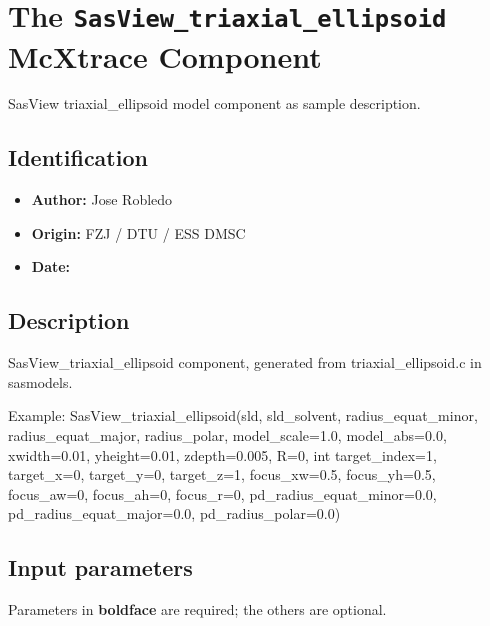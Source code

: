 \section{The \texttt{SasView\_triaxial\_ellipsoid} McXtrace Component}
SasView triaxial\_ellipsoid model component as sample description.

\subsection*{Identification}
\begin{itemize}
  \item \textbf{Author:} Jose Robledo
  \item \textbf{Origin:} FZJ / DTU / ESS DMSC
  \item \textbf{Date:} 
\end{itemize}

\subsection*{Description}
SasView\_triaxial\_ellipsoid component, generated from triaxial\_ellipsoid.c in sasmodels.

Example: SasView\_triaxial\_ellipsoid(sld, sld\_solvent, radius\_equat\_minor, radius\_equat\_major, radius\_polar, model\_scale=1.0, model\_abs=0.0, xwidth=0.01, yheight=0.01, zdepth=0.005, R=0, int target\_index=1, target\_x=0, target\_y=0, target\_z=1, focus\_xw=0.5, focus\_yh=0.5, focus\_aw=0, focus\_ah=0, focus\_r=0, pd\_radius\_equat\_minor=0.0, pd\_radius\_equat\_major=0.0, pd\_radius\_polar=0.0)

\subsection*{Input parameters}
Parameters in \textbf{boldface} are required; the others are optional.

